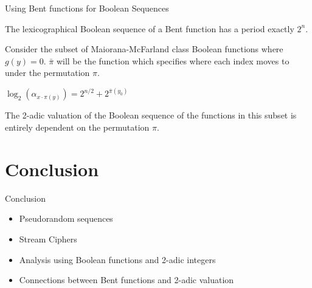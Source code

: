 \documentclass{beamer}
\begin{document}
\begin{frame}{Using Bent functions for Boolean Sequences}
  \begin{theorem}
    The lexicographical Boolean sequence of a Bent function has a period
    exactly $2^n$.
  \end{theorem}
\end{frame}

\begin{frame}
  \par Consider the subset of Maiorana-McFarland class Boolean functions where
  $g(y)=0$. $\bar{\pi}$ will be the function which specifies where each
  index moves to under the permutation $\pi$.
  
  \begin{theorem}
    $\log_2(\alpha_{x\cdot\pi(y)})=2^{n/2}+2^{\bar{\pi}(y_0)}$
  \end{theorem}

  \par The 2-adic valuation of the Boolean sequence of the functions in this
  subset is entirely dependent on the permutation $\pi$.
\end{frame}

\section{Conclusion}
\begin{frame}{Conclusion}
  \begin{itemize}
    \item Pseudorandom sequences
    \item Stream Ciphers
    \item Analysis using Boolean functions and 2-adic integers
    \item Connections between Bent functions and 2-adic valuation
  \end{itemize}
\end{frame}
\end{document}
